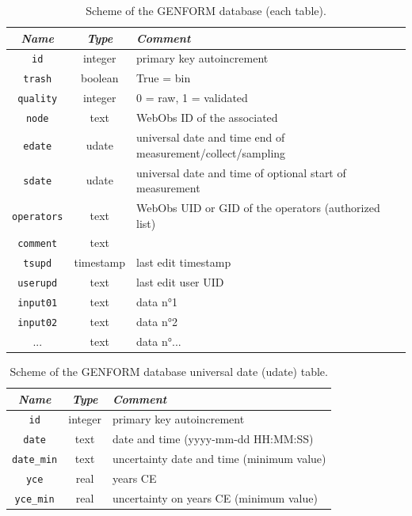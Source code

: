 \begin{table}[h]
	\centering
	\begin{tabular}{c c l}
		\hline
		\textit{Name} & \textit{Type} & \textit{Comment} \\
		\hline
		{\tt id}         & integer  & primary key autoincrement\\
		{\tt trash}      & boolean  & True = bin	\\
		{\tt quality}    & integer  & 0 = raw, 1 = validated \\
		{\tt node}       & text     & WebObs ID of the associated \wo{node} \\
		{\tt edate}      & udate    & universal date and time end of measurement/collect/sampling \\
		{\tt sdate}      & udate    & universal date and time of optional start of measurement \\
		{\tt operators}  & text     & WebObs UID or GID of the operators (authorized list) \\
		{\tt comment}    & text     & \\
		{\tt tsupd}      & timestamp & last edit timestamp \\
		{\tt userupd}    & text     & last edit user UID \\
		{\tt input01}    & text     & data n°1 \\
		{\tt input02}    & text     & data n°2 \\
		...              & text     & data n°... \\
		\hline
	\end{tabular}
	\caption{Scheme of the GENFORM database (each table).}
	\label{table:genform_dbtable}
\end{table}


\begin{table}[h]
	\centering
	\begin{tabular}{c c l}
		\hline
		\textit{Name} & \textit{Type} & \textit{Comment} \\
		\hline
		{\tt id}         & integer  & primary key autoincrement\\
		{\tt date}       & text     & date and time (yyyy-mm-dd HH:MM:SS) \\
		{\tt date\_min}   & text     & uncertainty date and time (minimum value) \\
		{\tt yce}        & real     & years CE \\
		{\tt yce\_min}    & real     & uncertainty on years CE (minimum value) \\
		\hline
	\end{tabular}
	\caption{Scheme of the GENFORM database universal date (udate) table.}
	\label{table:genform_dbudate}
\end{table}

